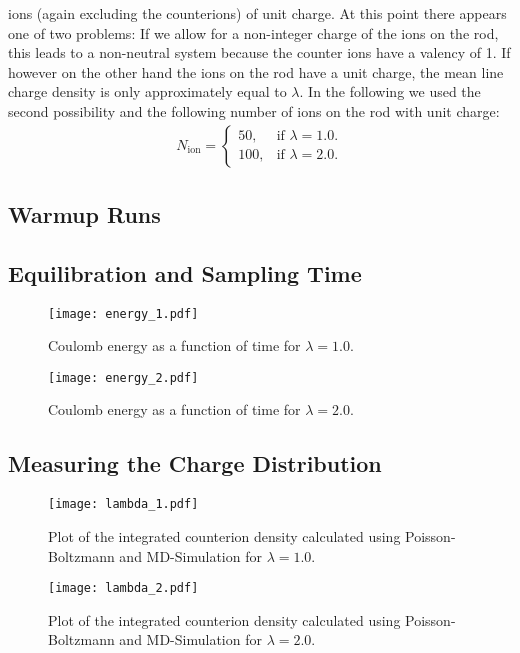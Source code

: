 \documentclass[a4paper,10pt,bibtotoc]{scrartcl}
\begin{document}
ions (again excluding the counterions) of unit charge. At this point there appears one of two problems: If we allow for a non-integer charge of the ions on the rod, this leads to a non-neutral system because the counter ions have a valency of 1. If however on the other hand the ions on the rod have a unit charge, the mean line charge density is only approximately equal to $\lambda$. In the following we used the second possibility and the following number of ions on the rod with unit charge:
\begin{align}
 N_{\mathrm{ion}} =  \begin{cases}
    50, & \text{if $\lambda=1.0$}.\\
    100, & \text{if $\lambda=2.0$}.
  \end{cases}
\end{align}





\subsection{Warmup Runs}
\subsection{Equilibration and Sampling Time}
\begin{figure}[h]
\centering
\texttt{[image: energy\_1.pdf]}
\caption{Coulomb energy as a function of time for $\lambda=1.0$.}
\label{fig:warmup1}
\texttt{[image: energy\_2.pdf]}
\caption{Coulomb energy as a function of time for $\lambda=2.0$.}
\label{fig:warmup2}
\end{figure}

\subsection{Measuring the Charge Distribution}

\begin{figure}[h]
\centering
\texttt{[image: lambda\_1.pdf]}
\caption{Plot of the integrated counterion density calculated using Poisson-Boltzmann and MD-Simulation for $\lambda=1.0$.}
\label{fig:sim1}
\texttt{[image: lambda\_2.pdf]}
\caption{Plot of the integrated counterion density calculated using Poisson-Boltzmann and MD-Simulation for $\lambda=2.0$.}
\label{fig:sim2}
\end{figure}
\end{document}
